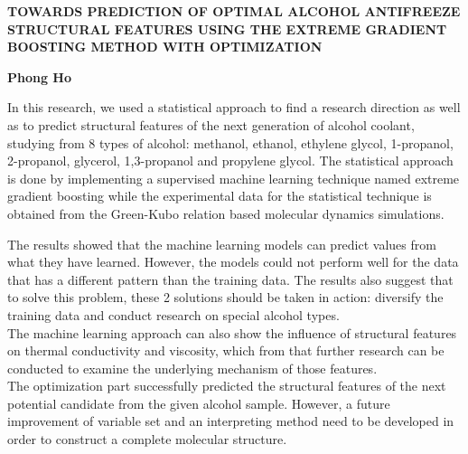 \thispagestyle{plain}
\begin{center}
    \renewcommand{\baselinestretch}{1.5}
    \Large
    \textbf{TOWARDS PREDICTION OF OPTIMAL ALCOHOL ANTIFREEZE STRUCTURAL 
    FEATURES USING THE EXTREME GRADIENT BOOSTING METHOD WITH OPTIMIZATION}
 
 
    \vspace{0.4cm}
    \large
    \textbf{Phong Ho}
 
\end{center}

In this research, we used a statistical approach to find a research direction 
as well as to predict structural features of the next generation of alcohol 
coolant, studying from 8 types of alcohol: methanol, ethanol, ethylene glycol, 
1-propanol, 2-propanol, glycerol, 1,3-propanol and propylene glycol. 
The statistical approach is done by implementing a supervised machine 
learning technique named extreme gradient boosting while the experimental 
data for the statistical technique is obtained from the Green-Kubo relation 
based molecular dynamics simulations.

The results showed that the machine learning models can predict values from 
what they have learned. However, the models could not perform well for the 
data that has a different pattern than the training data. The results also 
suggest that to solve this problem, these 2 solutions should be taken in 
action: diversify the training data and conduct research on special alcohol 
types.\\
The machine learning approach can also show the influence of structural 
features on thermal conductivity and viscosity, which from that further 
research can be conducted to examine the underlying mechanism of those 
features.\\
The optimization part successfully predicted the structural features of 
the next potential candidate from the given alcohol sample. However, a 
future improvement of variable set and an interpreting method need to be 
developed in order to construct a complete molecular structure.
